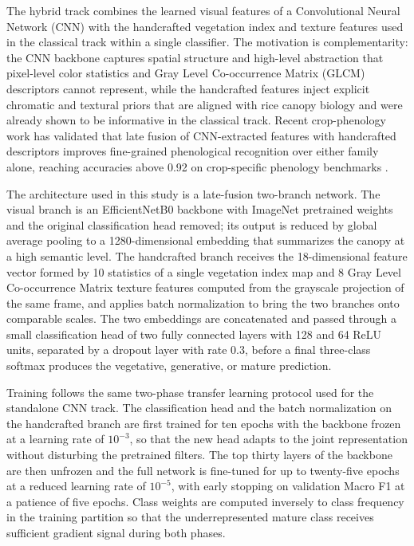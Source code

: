 The hybrid track combines the learned visual features of a Convolutional Neural Network (CNN) with the handcrafted vegetation index and texture features used in the classical track within a single classifier. The motivation is complementarity: the CNN backbone captures spatial structure and high-level abstraction that pixel-level color statistics and Gray Level Co-occurrence Matrix (GLCM) descriptors cannot represent, while the handcrafted features inject explicit chromatic and textural priors that are aligned with rice canopy biology and were already shown to be informative in the classical track. Recent crop-phenology work has validated that late fusion of CNN-extracted features with handcrafted descriptors improves fine-grained phenological recognition over either family alone, reaching accuracies above 0.92 on crop-specific phenology benchmarks \cite{yang2024phenologynet}.

The architecture used in this study is a late-fusion two-branch network. The visual branch is an EfficientNetB0 backbone with ImageNet pretrained weights and the original classification head removed; its output is reduced by global average pooling to a 1280-dimensional embedding that summarizes the canopy at a high semantic level. The handcrafted branch receives the 18-dimensional feature vector formed by 10 statistics of a single vegetation index map and 8 Gray Level Co-occurrence Matrix texture features computed from the grayscale projection of the same frame, and applies batch normalization to bring the two branches onto comparable scales. The two embeddings are concatenated and passed through a small classification head of two fully connected layers with 128 and 64 ReLU units, separated by a dropout layer with rate 0.3, before a final three-class softmax produces the vegetative, generative, or mature prediction.

Training follows the same two-phase transfer learning protocol used for the standalone CNN track. The classification head and the batch normalization on the handcrafted branch are first trained for ten epochs with the backbone frozen at a learning rate of $10^{-3}$, so that the new head adapts to the joint representation without disturbing the pretrained filters. The top thirty layers of the backbone are then unfrozen and the full network is fine-tuned for up to twenty-five epochs at a reduced learning rate of $10^{-5}$, with early stopping on validation Macro F1 at a patience of five epochs. Class weights are computed inversely to class frequency in the training partition so that the underrepresented mature class receives sufficient gradient signal during both phases.

